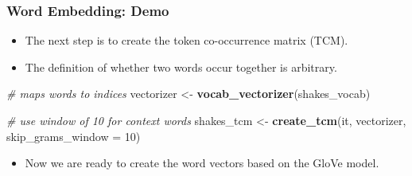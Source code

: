 \documentclass[
  shownotes,
  xcolor={svgnames},
  hyperref={colorlinks,citecolor=DarkBlue,linkcolor=DarkRed,urlcolor=DarkBlue}
  , aspectratio=169]{beamer}
\newenvironment{Shaded}{\begin{snugshade}}{\end{snugshade}}
\newcommand{\CommentTok}[1]{\textcolor[rgb]{0.56,0.35,0.01}{\textit{#1}}}
\newcommand{\DataTypeTok}[1]{\textcolor[rgb]{0.13,0.29,0.53}{#1}}
\newcommand{\DecValTok}[1]{\textcolor[rgb]{0.00,0.00,0.81}{#1}}
\newcommand{\FloatTok}[1]{\textcolor[rgb]{0.00,0.00,0.81}{#1}}
\newcommand{\KeywordTok}[1]{\textcolor[rgb]{0.13,0.29,0.53}{\textbf{#1}}}
\newcommand{\NormalTok}[1]{#1}
\newcommand{\OperatorTok}[1]{\textcolor[rgb]{0.81,0.36,0.00}{\textbf{#1}}}
\newcommand{\StringTok}[1]{\textcolor[rgb]{0.31,0.60,0.02}{#1}}
\begin{document}
\begin{frame}[fragile]
\frametitle{Word Embedding: Demo }

\begin{itemize}
\item The next step is to create the token co-occurrence matrix (TCM). 
\item The definition of whether two words occur together is arbitrary. 
\end{itemize}

\begin{scriptsize}

\begin{Shaded}
\begin{Highlighting}[]
\CommentTok{\# maps words to indices}
\NormalTok{vectorizer \textless{}{-}}\StringTok{ }\KeywordTok{vocab\_vectorizer}\NormalTok{(shakes\_vocab)}

\CommentTok{\# use window of 10 for context words}
\NormalTok{shakes\_tcm \textless{}{-}}\StringTok{ }\KeywordTok{create\_tcm}\NormalTok{(it, vectorizer, }\DataTypeTok{skip\_grams\_window =} \DecValTok{10}\NormalTok{)}
\end{Highlighting}
\end{Shaded}
\end{scriptsize}



\begin{itemize}
\item Now we are ready to create the word vectors based on the GloVe model.
\end{itemize}


\begin{scriptsize}


\begin{Shaded}
\end{Shaded}



\end{scriptsize}
\end{frame}
\end{document}
